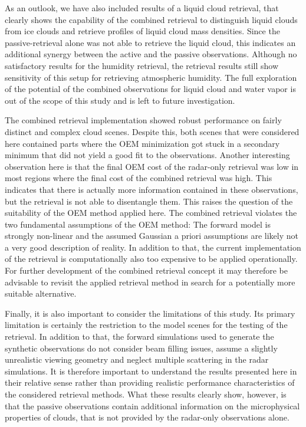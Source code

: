 \documentclass[journal abbreviation, manuscript]{copernicus}
\begin{document}
As an outlook, we have also included results of a liquid cloud retrieval, that
clearly shows the capability of the combined retrieval to distinguish liquid
clouds from ice clouds and retrieve profiles of liquid cloud mass densities.
Since the passive-retrieval alone was not able to retrieve the liquid cloud,
this indicates an additional synergy between the active and the passive
observations. Although no satisfactory results for the humidity retrieval, the
retrieval results still show sensitivity of this setup for retrieving
atmospheric humidity. The full exploration of the potential of the combined
observations for liquid cloud and water vapor is out of the scope of this study
and is left to future investigation.

The combined retrieval implementation showed robust performance on fairly
distinct and complex cloud scenes. Despite this, both scenes that were
considered here contained parts where the OEM minimization got stuck in a
secondary minimum that did not yield a good fit to the observations. Another
interesting observation here is that the final OEM cost of the radar-only
retrieval was low in most regions where the final cost of the combined retrieval
was high. This indicates that there is actually more information contained in
these observations, but the retrieval is not able to disentangle them. This
raises the question of the suitability of the OEM method applied here. The
combined retrieval violates the two fundamental assumptions of the OEM method:
The forward model is strongly non-linear and the assumed Gaussian a priori
assumptions are likely not a very good description of reality. In addition to
that, the current implementation of the retrieval is computationally also too
expensive to be applied operationally. For further development of the combined
retrieval concept it may therefore be advisable to revisit the applied retrieval
method in search for a potentially more suitable alternative.

Finally, it is also important to consider the limitations of this study. Its
primary limitation is certainly the restriction to the model scenes for the
testing of the retrieval. In addition to that, the forward simulations used to
generate the synthetic observations do not consider beam filling issues, assume a
slightly unrealistic viewing geometry and neglect multiple scattering in the
radar simulations. It is therefore important to understand the results presented
here in their relative sense rather than providing realistic performance
characteristics of the considered retrieval methods. What these results clearly
show, however, is that the passive observations contain additional information
on the microphysical properties of clouds, that is not provided by the
radar-only observations alone.
\end{document}
